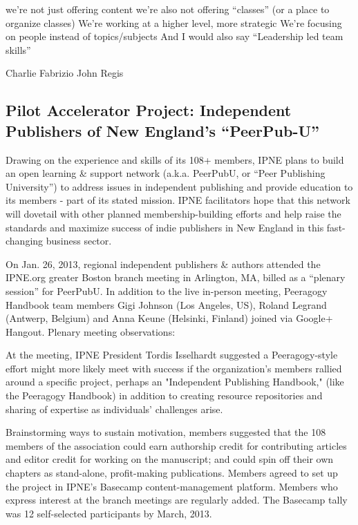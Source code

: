 \documentclass{acm_proc_article-sp}
\begin{document}
we're not just offering content
we're also not offering ``classes'' (or a place to organize classes)
We're working at a higher level, more strategic
We're focusing on people instead of topics/subjects
And I would also say ``Leadership led team skills''

Charlie
Fabrizio
John
Regis

\subsection{Pilot Accelerator Project: Independent Publishers of New England’s “PeerPub-U”}

Drawing on the experience and skills of its 108+ members, IPNE plans to build an open learning & support network (a.k.a. PeerPubU, or “Peer Publishing University”) to address issues in independent publishing and provide education to its members - part of its stated mission. IPNE facilitators hope that this network will dovetail with other planned membership-building efforts and help raise the standards and maximize success of indie publishers in New England in this fast-changing business sector.

On Jan. 26, 2013, regional independent publishers & authors attended the IPNE.org greater Boston branch meeting in Arlington, MA, billed as a “plenary session” for PeerPubU. In addition to the live in-person meeting, Peeragogy Handbook team members Gigi Johnson (Los Angeles, US), Roland Legrand (Antwerp, Belgium) and Anna Keune (Helsinki, Finland) joined via Google+ Hangout.
Plenary meeting observations:

At the meeting, IPNE President Tordis Isselhardt suggested a Peeragogy-style effort might more likely meet with success if the organization's members rallied around a specific project, perhaps an "Independent Publishing Handbook," (like the Peeragogy Handbook) in addition to creating resource repositories and sharing of expertise as individuals’ challenges arise.

Brainstorming ways to sustain motivation, members suggested that the 108 members of the association could earn authorship credit for contributing articles and editor credit for working on the manuscript; and could spin off their own chapters as stand-alone, profit-making publications.
Members agreed to set up the project in IPNE’s Basecamp content-management platform. Members who express interest at the branch meetings are regularly added. The Basecamp tally was 12 self-selected participants by March, 2013. 
\end{document}
